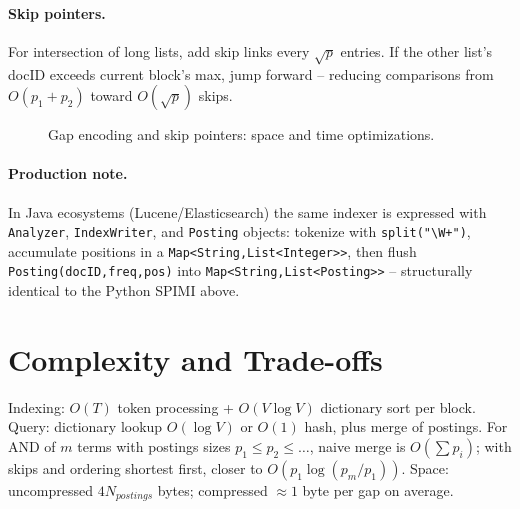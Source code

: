 \paragraph{Skip pointers.} For intersection of long lists, add skip links every $\sqrt{p}$ entries. If the other list's docID exceeds current block's max, jump forward -- reducing comparisons from $O(p_1+p_2)$ toward $O(\sqrt{p})$ skips.

\begin{figure}[h]\centering
{}
\caption{Gap encoding and skip pointers: space and time optimizations.}
\label{fig:compression}
\end{figure}

\begin{sloppypar}
\paragraph{Production note.} In Java ecosystems (Lucene/Elasticsearch) the same indexer is expressed with \texttt{Analyzer}, \texttt{IndexWriter}, and \texttt{Posting} objects: tokenize with \texttt{split("\textbackslash W+")}, accumulate positions in a \texttt{Map<String,List<Integer>>}, then flush \texttt{Posting(docID,freq,pos)} into \texttt{Map<String,List<Posting>>} -- structurally identical to the Python SPIMI above.
\end{sloppypar}

\section{Complexity and Trade-offs}\label{sec:complexity}
Indexing: $O(T)$ token processing + $O(V\log V)$ dictionary sort per block. Query: dictionary lookup $O(\log V)$ or $O(1)$ hash, plus merge of postings. For AND of $m$ terms with postings sizes $p_1\le p_2\le\dots$, naive merge is $O(\sum p_i)$; with skips and ordering shortest first, closer to $O(p_1\log(p_m/p_1))$. Space: uncompressed $4N_{postings}$ bytes; compressed $\approx 1$ byte per gap on average.

